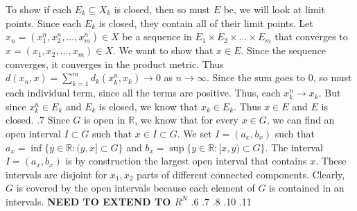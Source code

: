 \documentclass[12pt]{exam}
\begin{document}
\begin{questions}
To show if each $E_k \subseteq X_k$ is closed, then so must $E$ be, we will look at limit points. Since each $E_k$ is closed, they contain all of their limit points. Let $x_n = (x_1^n, x_2^n, ..., x^n_m) \in X$ be a sequence in $E_1 \times E_2 \times ... \times E_m$ that converges to $x = (x_1, x_2, ..., x_m) \in X$. We want to show that $x \in E$. Since the sequence converges, it converges in the product metric. Thus $d(x_n, x) = \sum_{k=1}^{m} d_k(x^n_k, x_k) \rightarrow 0$ as $n\rightarrow \infty$. Since the sum goes to $0$, so must each individual term, since all the terms are positive. Thus, each $x^n_k \rightarrow x_k$. But since $x_k^n \in E_k$ and $E_k$ is closed, we know that $x_k \in E_k$. Thus $x \in E$ and $E$ is closed. 
.7\newline
Since $G$ is open in $\mathbb{R}$, we know that for every $x \in G$, we can find an open interval $I \subset G$ such that $x \in I \subset G$. We set $I = (a_x, b_x)$ such that $a_x = \inf\{y \in \mathbb{R} : (y,x] \subset G\}$ and $b_x = \sup\{y \in \mathbb{R} : [x,y) \subset G\}$. The interval $I = (a_x, b_x)$ is by construction the largest open interval that contains $x$. These intervals are disjoint for $x_1, x_2$ parts of different connected components. Clearly, $G$ is covered by the open intervals because each element of $G$ is contained in an intervals. \textbf{NEED TO EXTEND TO $R^N$}
.6
.7
.8
.10
.11

\end{questions}
\end{document}
